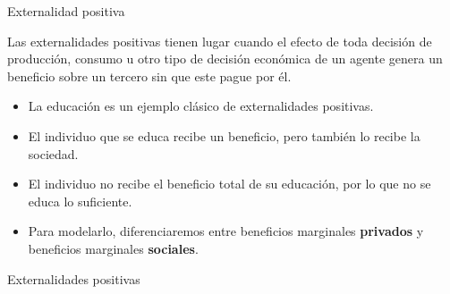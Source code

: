 \documentclass{beamer}
\begin{document}
\begin{frame}{Externalidad positiva}
    \begin{boxA}
        Las externalidades positivas tienen lugar cuando el efecto de
        toda decisión de producción, consumo u otro tipo de decisión
        económica de un agente genera un beneficio sobre un tercero sin
        que este pague por él.
    \end{boxA}
    \begin{itemize}
        \item La educación es un ejemplo clásico de externalidades positivas.
        \item El individuo que se educa recibe un beneficio, pero también lo recibe la sociedad.
        \item El individuo no recibe el beneficio total de su educación, por lo que no se educa lo suficiente.
        \item Para modelarlo, diferenciaremos entre beneficios marginales \textbf{privados} y beneficios marginales \textbf{sociales}.
    \end{itemize}
\end{frame}



\begin{frame}{Externalidades positivas}
\begin{figure} [H]
\centering
{}
\end{figure} 
\end{frame}
\end{document}
